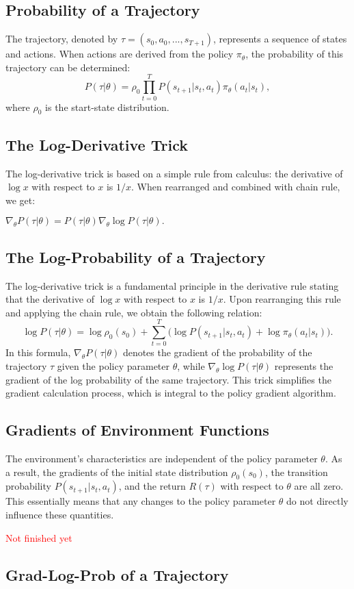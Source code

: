 \subsection{Probability of a Trajectory}
The trajectory, denoted by $\tau = (s_0, a_0, ..., s_{T+1})$, represents a sequence of states and actions. When actions are derived from the policy $\pi_{\theta}$, the probability of this trajectory can be determined:
$$
P(\tau|\theta) = \rho_0 \prod_{t=0}^{T} P(s_{t+1}|s_t, a_t) \pi_{\theta}(a_t |s_t),$$
where $\rho_0 $  is the start-state distribution.

\subsection{The Log-Derivative Trick}

The log-derivative trick is based on a simple rule from calculus: the derivative of $\log x$ with respect to $x$ is $1/x$. When rearranged and combined with chain rule, we get:

$\nabla_{\theta} P(\tau | \theta) = P(\tau | \theta) \nabla_{\theta} \log P(\tau | \theta).$

\subsection{The Log-Probability of a Trajectory}\label{log_prob}

The log-derivative trick is a fundamental principle in the derivative rule stating that the derivative of $\log x$ with respect to $x$ is $1/x$. Upon rearranging this rule and applying the chain rule, we obtain the following relation:
$$
\log P(\tau|\theta) = \log \rho_0 (s_0) + \sum_{t=0}^{T} \bigg( \log P(s_{t+1}|s_t, a_t)  + \log \pi_{\theta}(a_t |s_t)\bigg).$$
In this formula, $\nabla_{\theta} P(\tau | \theta)$ denotes the gradient of the probability of the trajectory $\tau$ given the policy parameter $\theta$, while $\nabla_{\theta} \log P(\tau | \theta)$ represents the gradient of the log probability of the same trajectory. This trick simplifies the gradient calculation process, which is integral to the policy gradient algorithm.

\subsection{Gradients of Environment Functions}\label{sec_gradient_env}

The environment's characteristics are independent of the policy parameter $\theta$. As a result, the gradients of the initial state distribution $\rho_0(s_0)$, the transition probability $P(s_{t+1}|s_t, a_t)$, and the return $R(\tau)$ with respect to $\theta$ are all zero. This essentially means that any changes to the policy parameter $\theta$ do not directly influence these quantities.

\textcolor{red}{Not finished yet}


\subsection{Grad-Log-Prob of a Trajectory}

